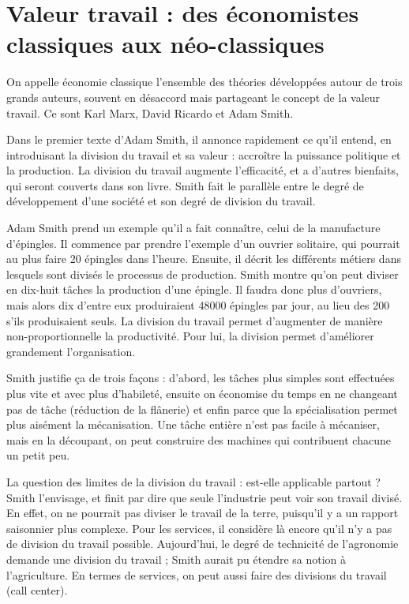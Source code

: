 \documentclass[a4paper,12pt]{book}
\begin{document}
\section{Valeur travail : des économistes classiques aux néo-classiques}
On appelle économie classique l'ensemble des théories développées autour de trois grands auteurs, souvent en désaccord mais partageant le concept de la valeur travail. Ce sont Karl Marx, David Ricardo et Adam Smith.
\par Dans le premier texte d'Adam Smith, il annonce rapidement ce qu'il entend, en introduisant la division du travail et sa valeur : accroître la puissance politique et la production. La division du travail augmente l'efficacité, et a d'autres bienfaits, qui seront couverts dans son livre. Smith fait le parallèle entre le degré de développement d'une société et son degré de division du travail.
\par Adam Smith prend un exemple qu'il a fait connaître, celui de la manufacture d'épingles. Il commence par prendre l'exemple d'un ouvrier solitaire, qui pourrait au plus faire 20 épingles dans l'heure. Ensuite, il décrit les différents métiers dans lesquels sont divisés le processus de production. Smith montre qu'on peut diviser en dix-huit tâches la production d'une épingle. Il faudra donc plus d'ouvriers, mais alors dix d'entre eux produiraient 48000 épingles par jour, au lieu des 200 s'ils produisaient seuls. La division du travail permet d'augmenter de manière non-proportionnelle la productivité. Pour lui, la division permet d'améliorer grandement l'organisation.
\par Smith justifie ça de trois façons : d'abord, les tâches plus simples sont effectuées plus vite et avec plus d'habileté, ensuite on économise du temps en ne changeant pas de tâche (réduction de la flânerie) et enfin parce que la spécialisation permet plus aisément la mécanisation. Une tâche entière n'est pas facile à mécaniser, mais en la découpant, on peut construire des machines qui contribuent chacune un petit peu.
\par La question des limites de la division du travail : est-elle applicable partout ? Smith l'envisage, et finit par dire que seule l'industrie peut voir son travail divisé. En effet, on ne pourrait pas diviser le travail de la terre, puisqu'il y a un rapport saisonnier plus complexe. Pour les services, il considère là encore qu'il n'y a pas de division du travail possible. Aujourd'hui, le degré de technicité de l'agronomie demande une division du travail ; Smith aurait pu étendre sa notion à l'agriculture. En termes de services, on peut aussi faire des divisions du travail (call center).
\end{document}
